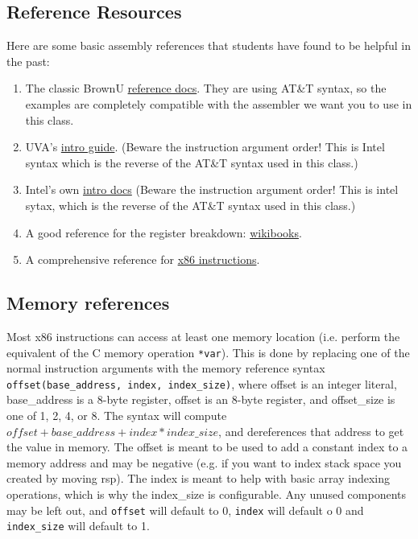 \documentclass[11pt]{article}
\begin{document}
\subsection{Reference Resources}

Here are some basic assembly references that students have found to be helpful in the
past:

\begin{enumerate}
    \item The classic BrownU
        \href{https://cs.brown.edu/courses/cs033/docs/guides/x64_cheatsheet.pdf}{reference
        docs}. They are using AT\&T syntax, so the examples are completely compatible with
        the assembler we want you to use in this class.
    \item UVA's \href{https://www.cs.virginia.edu/~evans/cs216/guides/x86.html}{intro
        guide}. (Beware the instruction argument order! This is Intel syntax which
        is the reverse of the AT\&T syntax used in this class.)
    \item Intel's own
        \href{https://www.intel.com/content/dam/develop/external/us/en/documents/introduction-to-x64-assembly-181178.pdf}{intro docs}
        (Beware the instruction argument order! This is intel sytax, which is the reverse
        of the AT\&T syntax used in this class.)
    \item A good reference for the register breakdown:
        \href{https://en.wikibooks.org/wiki/X86_Assembly/X86_Architecture}{wikibooks}.
    \item A comprehensive reference for
        \href{https://www.felixcloutier.com/x86/}{x86 instructions}.
\end{enumerate}

\subsection{Memory references}

Most x86 instructions can access at least one memory location (i.e. perform the equivalent
of the C memory operation \texttt{*var}). This is done by replacing one of the normal
instruction arguments with the memory reference syntax \texttt{offset(base\_address,
index, index\_size)}, where offset is an integer literal, base\_address is a 8-byte
register, offset is an 8-byte register, and offset\_size is one of 1, 2, 4, or 8. The
syntax will compute $offset + base\_address + index * index\_size$, and dereferences that
address to get the value in memory. The offset is meant to be used to add a constant index
to a memory address and may be negative (e.g. if you want to index stack space you created
by moving rsp). The index is meant to help with basic array indexing operations, which is
why the index\_size is configurable. Any unused components may be left out, and
\texttt{offset} will default to 0, \texttt{index} will default o 0 and \texttt{index\_size}
will default to 1.
\end{document}
